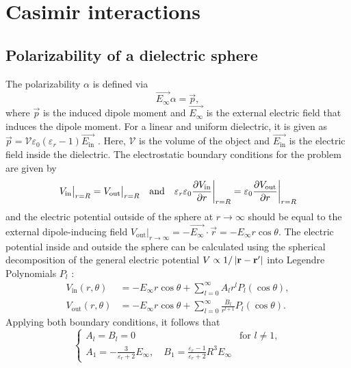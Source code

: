 \chapter{Casimir interactions}
\section{Polarizability of a dielectric sphere}
\label{apx:polarizability-sphere}

The polarizability $\alpha$ is defined via
\begin{equation}
  \vec{E_\infty} \alpha = \vec{p},
\end{equation}
where $\vec{p}$ is the induced dipole moment and $\vec{E_\infty}$ is the external electric field that induces the dipole moment. For a linear and uniform dielectric, it is given as $\vec{p} = \mathcal{V} \varepsilon_0 (\varepsilon_r - 1) \vec{E_\mathrm{in}}$ \cite[p. 220-226]{Griffiths_2018}. Here, $\mathcal{V}$ is the volume of the object and $\vec{E_\mathrm{in}}$ is the electric field inside the dielectric.
The electrostatic boundary conditions for the problem are given by
\begin{equation}
  V_\mathrm{in} \big|_{r=R} = V_\mathrm{out} \big|_{r=R} 
  \quad \text{and} \quad 
  \varepsilon_r\varepsilon_0\pdv{V_\mathrm{in}}{r}\bigg|_{r=R} = \varepsilon_0\pdv{V_\mathrm{out}}{r} \bigg|_{r=R}
\end{equation}
and the electric potential outside of the sphere at $r\rightarrow\infty$ should be equal to the external dipole-inducing field $V_\mathrm{out} |_{r\rightarrow\infty} = -\vec{E_\infty} \cdot \vec{r} = -E_\infty r\cos\theta$.
The electric potential inside and outside the sphere can be calculated using the spherical decomposition of the general electric potential $V \propto 1/\abs{\vec{r} - \vec{r'}}$ into Legendre Polynomials $P_l$ \cite[p. 188-190]{Griffiths_2018}:
\begin{align}
  V_\mathrm{in}(r, \theta) &= -E_\infty r\cos\theta + \sum_{l=0}^{\infty} A_l r^l P_l(\cos\theta), \\
  V_\mathrm{out}(r, \theta) &= -E_\infty r \cos\theta + \sum_{l=0}^{\infty} \frac{B_l}{r^{l+1}} P_l(\cos\theta).
\end{align}
Applying both boundary conditions, it follows that \cite[p. 249-251]{Griffiths_2018}
\begin{equation}
  \begin{cases}
    A_l = B_l = 0 & \text{for } l \neq 1, \\
  A_1 = -\frac{3}{\varepsilon_r + 2}E_\infty, \quad B_1 = \frac{\varepsilon_r-1}{\varepsilon_r + 2}R^3E_\infty
  \end{cases}
\end{equation}
